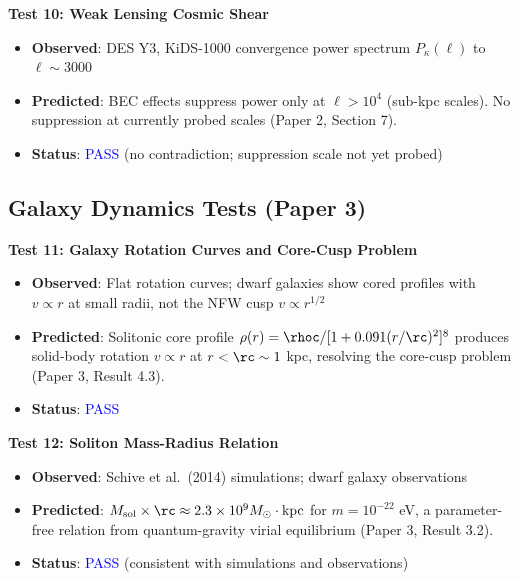\documentclass[11pt,a4paper]{article}
\theoremstyle{definition}
\theoremstyle{remark}
\begin{document}
\textbf{Test 10: Weak Lensing Cosmic Shear}

\begin{itemize}[leftmargin=*, itemsep=0.1em]
\item \textbf{Observed}: DES Y3, KiDS-1000 convergence power spectrum $P_\kappa(\ell)$ to $\ell \sim 3000$
\item \textbf{Predicted}: BEC effects suppress power only at $\ell > 10^4$ (sub-kpc scales). No suppression at currently probed scales (Paper 2, Section 7).
\item \textbf{Status}: \textcolor{blue}{PASS} (no contradiction; suppression scale not yet probed)
\end{itemize}

\subsection{Galaxy Dynamics Tests (Paper 3)}
\label{sec:tests_galactic}

\textbf{Test 11: Galaxy Rotation Curves and Core-Cusp Problem}

\begin{itemize}[leftmargin=*, itemsep=0.1em]
\item \textbf{Observed}: Flat rotation curves; dwarf galaxies show cored profiles with $v \propto r$ at small radii, not the NFW cusp $v \propto r^{1/2}$
\item \textbf{Predicted}: Solitonic core profile $\rho(r) = \rhoc/[1+0.091(r/\rc)^2]^8$ produces solid-body rotation $v \propto r$ at $r < \rc \sim 1$ kpc, resolving the core-cusp problem (Paper 3, Result 4.3).
\item \textbf{Status}: \textcolor{blue}{PASS}
\end{itemize}

\textbf{Test 12: Soliton Mass-Radius Relation}

\begin{itemize}[leftmargin=*, itemsep=0.1em]
\item \textbf{Observed}: Schive et al.\ (2014) simulations; dwarf galaxy observations
\item \textbf{Predicted}: $M_{\mathrm{sol}} \times \rc \approx 2.3 \times 10^9 M_\odot \cdot \mathrm{kpc}$ for $m = 10^{-22}$ eV, a parameter-free relation from quantum-gravity virial equilibrium (Paper 3, Result 3.2).
\item \textbf{Status}: \textcolor{blue}{PASS} (consistent with simulations and observations)
\end{itemize}
\end{document}
